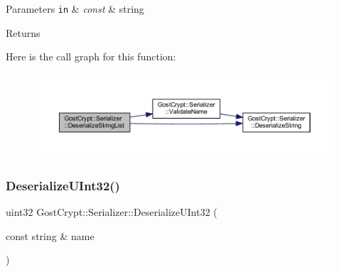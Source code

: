 \begin{DoxyParams}[1]{Parameters}
\mbox{\tt in}  & {\em const} & string \\
\hline
\end{DoxyParams}
\begin{DoxyReturn}{Returns}

\end{DoxyReturn}
Here is the call graph for this function\+:
\nopagebreak
\begin{figure}[H]
\begin{center}
\leavevmode
\includegraphics[width=350pt]{class_gost_crypt_1_1_serializer_a9d973fc5d0ef82706491ca37e1946cba_cgraph}
\end{center}
\end{figure}
\mbox{\label{class_gost_crypt_1_1_serializer_ac030398e0f4887da331e91cdcf2e2b67}} 
\subsubsection{\texorpdfstring{Deserialize\+U\+Int32()}{DeserializeUInt32()}}
{\footnotesize\ttfamily uint32 Gost\+Crypt\+::\+Serializer\+::\+Deserialize\+U\+Int32 (\begin{DoxyParamCaption}\item[{const string \&}]{name }\end{DoxyParamCaption})}


